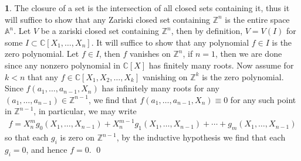 \documentclass[11pt]{article}
\theoremstyle{definition}
\newtheorem{pb}{}
\begin{document}
    \begin{pb}
        The closure of a set is the intersection of all closed sets containing it, thus it will suffice to show that any Zariski closed set containing \(\mathbb{Z}^n\) is the entire space \(\mathbb{A}^n\). Let \(V\) be a zariski closed set containing \(\mathbb{Z}^n\), then by definition, \(V = V(I)\) for some \(I \subset \mathbb{C}[X_1,\hdots,X_n]\). It will suffice to show that any polynomial \(f \in I\) is the zero polynomial. Let \(f \in I\), then \(f\) vanishes on \(\mathbb{Z}^n\), if \(n = 1\), then we are done since any nonzero polynomial in \(\mathbb{C}[X]\) has finitely many roots. Now assume for \(k < n\) that any \(f \in \mathbb{C}[X_1,X_2,\hdots,X_k]\) vanishing on \(\mathbb{Z}^k\) is the zero polynomial. Since \(f(a_1,\hdots,a_{n-1},X_n)\) has infinitely many roots for any \((a_1,\hdots,a_{n-1}) \in \mathbb{Z}^{n-1}\), we find that \(f(a_1,\hdots,a_{n-1},X_n) \equiv 0\) for any such point in \(\mathbb{Z}^{n-1}\), in particular, we may write
        \begin{align*}
            f = X^m_ng_0(X_1,\hdots,X_{n-1}) + X_n^{m-1}g_1(X_1,\hdots,X_{n-1}) + \cdots + g_m(X_1,\hdots,X_{n-1})
        \end{align*}
        so that each \(g_i\) is zero on \(\mathbb{Z}^{n-1}\), by the inductive hypothesis we find that each \(g_i = 0\), and hence \(f = 0\). \qed
    \end{pb}
\end{document}
